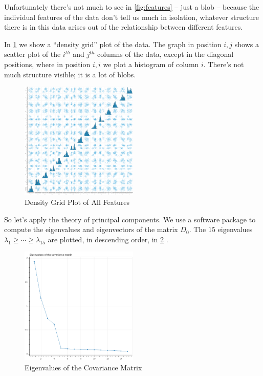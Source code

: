 \documentclass[
]{article}
\begin{document}
Unfortunately there's not much to see in \cref{fig:features} -- just a
blob -- because the individual features of the data don't tell us much
in isolation, whatever structure there is in this data arises out of the
relationship between different features.

In \cref{fig:densitygrid} we show a ``density grid'' plot of the data.
The graph in position \(i,j\) shows a scatter plot of the \(i^{th}\) and
\(j^{th}\) columns of the data, except in the diagonal positions, where
in position \(i,i\) we plot a histogram of column \(i\). There's not
much structure visible; it is a lot of blobs.

\begin{figure}
\hypertarget{fig:densitygrid}{%
\centering
\includegraphics[width=0.5\textwidth,height=\textheight]{../img/density.png}
\caption{Density Grid Plot of All Features}\label{fig:densitygrid}
}
\end{figure}

So let's apply the theory of principal components. We use a software
package to compute the eigenvalues and eigenvectors of the matrix
\(D_{0}\). The \(15\) eigenvalues
\(\lambda_{1}\ge \cdots \ge \lambda_{15}\) are plotted, in descending
order, in \cref{fig:eigenvalues} .

\begin{figure}
\hypertarget{fig:eigenvalues}{%
\centering
\includegraphics[width=0.5\textwidth,height=\textheight]{../img/eigenvalues.png}
\caption{Eigenvalues of the Covariance Matrix}\label{fig:eigenvalues}
}
\end{figure}
\end{document}
